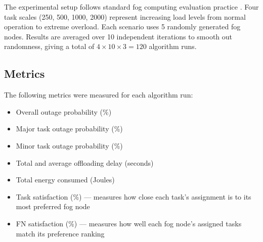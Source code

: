The experimental setup follows standard fog computing evaluation practice \cite{gupta2017ifogsim}. Four task scales (250, 500, 1000, 2000) represent increasing load levels from normal operation to extreme overload. Each scenario uses 5 randomly generated fog nodes. Results are averaged over 10 independent iterations to smooth out randomness, giving a total of $4 \times 10 \times 3 = 120$ algorithm runs.

\subsection{Metrics}

The following metrics were measured for each algorithm run:
\begin{itemize}
\item Overall outage probability (\%)
\item Major task outage probability (\%)
\item Minor task outage probability (\%)
\item Total and average offloading delay (seconds)
\item Total energy consumed (Joules)
\item Task satisfaction (\%) --- measures how close each task's assignment is to its most preferred fog node
\item FN satisfaction (\%) --- measures how well each fog node's assigned tasks match its preference ranking
\end{itemize}